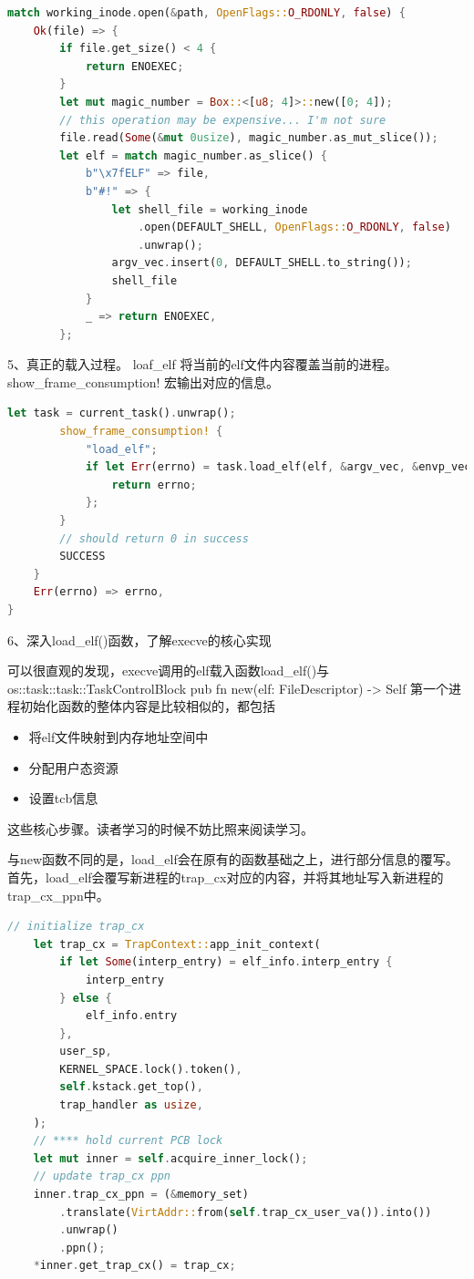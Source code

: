 \begin{lstlisting}[language={Rust}, 
    caption={对elf文件检查}]
match working_inode.open(&path, OpenFlags::O_RDONLY, false) {
    Ok(file) => {
        if file.get_size() < 4 {
            return ENOEXEC;
        }
        let mut magic_number = Box::<[u8; 4]>::new([0; 4]);
        // this operation may be expensive... I'm not sure
        file.read(Some(&mut 0usize), magic_number.as_mut_slice());
        let elf = match magic_number.as_slice() {
            b"\x7fELF" => file,
            b"#!" => {
                let shell_file = working_inode
                    .open(DEFAULT_SHELL, OpenFlags::O_RDONLY, false)
                    .unwrap();
                argv_vec.insert(0, DEFAULT_SHELL.to_string());
                shell_file
            }
            _ => return ENOEXEC,
        };

\end{lstlisting}
5、真正的载入过程。 loaf_elf 将当前的elf文件内容覆盖当前的进程。show_frame_consumption! 宏输出对应的信息。
\begin{lstlisting}[language={Rust}, 
    caption={execve载入可执行文件}]
let task = current_task().unwrap();
        show_frame_consumption! {
            "load_elf";
            if let Err(errno) = task.load_elf(elf, &argv_vec, &envp_vec) {
                return errno;
            };
        }
        // should return 0 in success
        SUCCESS
    }
    Err(errno) => errno,
}

\end{lstlisting}
6、深入load_elf()函数，了解execve的核心实现

可以很直观的发现，execve调用的elf载入函数load_elf()与
os::task::task::TaskControlBlock pub fn new(elf: FileDescriptor) -> Self 
第一个进程初始化函数的整体内容是比较相似的，都包括
\begin{itemize}
    \item 将elf文件映射到内存地址空间中
    \item 分配用户态资源
    \item 设置tcb信息
\end{itemize}
这些核心步骤。读者学习的时候不妨比照来阅读学习。

与new函数不同的是，load_elf会在原有的函数基础之上，进行部分信息的覆写。
首先，load_elf会覆写新进程的trap_cx对应的内容，并将其地址写入新进程的trap_cx_ppn中。

\begin{lstlisting}[language={Rust}, 
    caption={load_elf信息覆写-1}]
 // initialize trap_cx
    let trap_cx = TrapContext::app_init_context(
        if let Some(interp_entry) = elf_info.interp_entry {
            interp_entry
        } else {
            elf_info.entry
        },
        user_sp,
        KERNEL_SPACE.lock().token(),
        self.kstack.get_top(),
        trap_handler as usize,
    );
    // **** hold current PCB lock
    let mut inner = self.acquire_inner_lock();
    // update trap_cx ppn
    inner.trap_cx_ppn = (&memory_set)
        .translate(VirtAddr::from(self.trap_cx_user_va()).into())
        .unwrap()
        .ppn();
    *inner.get_trap_cx() = trap_cx;
\end{lstlisting}

